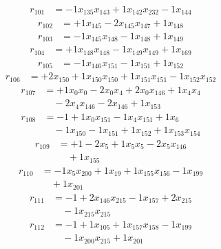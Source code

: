 \[\begin{aligned}
r_{101} &= - 1 x_{135} x_{143} + 1 x_{142} x_{232} - 1 x_{144}
\end{aligned}\]
\[\begin{aligned}
r_{102} &= + 1 x_{145} - 2 x_{145} x_{147} + 1 x_{148}
\end{aligned}\]
\[\begin{aligned}
r_{103} &= - 1 x_{145} x_{148} - 1 x_{148} + 1 x_{149}
\end{aligned}\]
\[\begin{aligned}
r_{104} &= + 1 x_{148} x_{148} - 1 x_{149} x_{149} + 1 x_{169}
\end{aligned}\]
\[\begin{aligned}
r_{105} &= - 1 x_{146} x_{151} - 1 x_{151} + 1 x_{152}
\end{aligned}\]
\[\begin{aligned}
r_{106} &= + 2 x_{150} + 1 x_{150} x_{150} + 1 x_{151} x_{151} - 1 x_{152} x_{152}
\end{aligned}\]
\[\begin{aligned}
r_{107} &= + 1 x_{0} x_{0} - 2 x_{0} x_{4} + 2 x_{0} x_{146} + 1 x_{4} x_{4} \\
 &\quad - 2 x_{4} x_{146} - 2 x_{146} + 1 x_{153}
\end{aligned}\]
\[\begin{aligned}
r_{108} &= - 1 + 1 x_{0} x_{151} - 1 x_{4} x_{151} + 1 x_{6} \\
 &\quad - 1 x_{150} - 1 x_{151} + 1 x_{152} + 1 x_{153} x_{154}
\end{aligned}\]
\[\begin{aligned}
r_{109} &= + 1 - 2 x_{5} + 1 x_{5} x_{5} - 2 x_{5} x_{146} \\
 &\quad + 1 x_{155}
\end{aligned}\]
\[\begin{aligned}
r_{110} &= - 1 x_{5} x_{200} + 1 x_{19} + 1 x_{155} x_{156} - 1 x_{199} \\
 &\quad + 1 x_{201}
\end{aligned}\]
\[\begin{aligned}
r_{111} &= - 1 + 2 x_{146} x_{215} - 1 x_{157} + 2 x_{215} \\
 &\quad - 1 x_{215} x_{215}
\end{aligned}\]
\[\begin{aligned}
r_{112} &= - 1 + 1 x_{105} + 1 x_{157} x_{158} - 1 x_{199} \\
 &\quad - 1 x_{200} x_{215} + 1 x_{201}
\end{aligned}\]
